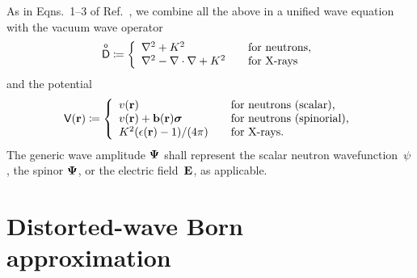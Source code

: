 As in Eqns.~1--3 of Ref.~\cite{PoVB20},
we combine all the above in a unified wave equation
%
with the vacuum wave operator
%
%
\begin{equation}\label{EDo}
  \mathsf{\overset{o}{D}} \coloneqq \left\{ \begin{array}{ll}
      \mathbf{\nabla}^2 + K^2                     &\text{~~~for neutrons,}\\
      \mathbf{\nabla}^2 - \mathbf{\nabla}\cdot\mathbf{\nabla} + K^2 &\text{~~~for X-rays}
  \end{array}\right.
\end{equation}
%
and the potential
%
%
\begin{equation}\label{ETV}
  \mathsf{V}(\mathbf{r}) \coloneqq \left\{ \begin{array}{ll}
      v(\mathbf{r})                         &\text{~~~for neutrons (scalar),}\\
      v(\mathbf{r})+\mathbf{b}(\mathbf{r})\bm\sigma       &\text{~~~for neutrons (spinorial),}\\
      K^2(\epsilon(\mathbf{r})-1)/(4\pi) &\text{~~~for X-rays.}
  \end{array}\right.
\end{equation}
The generic wave amplitude $\mathbf{\Psi}$
%
shall represent
the scalar neutron wavefunction~$\psi$,
the spinor $\mathbf{\Psi}$, or the electric field~$\mathbf{E}$, as applicable.


\section{Distorted-wave Born approximation}\label{SDWBA}

